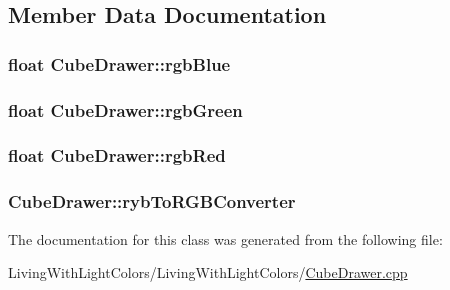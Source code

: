 \subsection{Member Data Documentation}
\hypertarget{class_cube_drawer_ab72d63224a9a847b174bf645b9c21da6}{
\subsubsection[{rgb\+Blue}]{\setlength{\rightskip}{0pt plus 5cm}float Cube\+Drawer\+::rgb\+Blue\hspace{0.3cm}{\ttfamily [private]}}}\label{class_cube_drawer_ab72d63224a9a847b174bf645b9c21da6}
\hypertarget{class_cube_drawer_a9d0faded7b1cea3fd2ffdc37074826d0}{
\subsubsection[{rgb\+Green}]{\setlength{\rightskip}{0pt plus 5cm}float Cube\+Drawer\+::rgb\+Green\hspace{0.3cm}{\ttfamily [private]}}}\label{class_cube_drawer_a9d0faded7b1cea3fd2ffdc37074826d0}
\hypertarget{class_cube_drawer_a5f960475b30e9508076bde88e591c470}{
\subsubsection[{rgb\+Red}]{\setlength{\rightskip}{0pt plus 5cm}float Cube\+Drawer\+::rgb\+Red\hspace{0.3cm}{\ttfamily [private]}}}\label{class_cube_drawer_a5f960475b30e9508076bde88e591c470}
\hypertarget{class_cube_drawer_ab9483b262b62ff540e3464b17f2a57d1}{
\subsubsection[{ryb\+To\+R\+G\+B\+Converter}]{ Cube\+Drawer\+::ryb\+To\+R\+G\+B\+Converter\hspace{0.3cm}{\ttfamily [private]}}}\label{class_cube_drawer_ab9483b262b62ff540e3464b17f2a57d1}


The documentation for this class was generated from the following file\+:\begin{DoxyCompactItemize}
\item 
Living\+With\+Light\+Colors/\+Living\+With\+Light\+Colors/\hyperlink{_cube_drawer_8cpp}{Cube\+Drawer.\+cpp}\end{DoxyCompactItemize}
